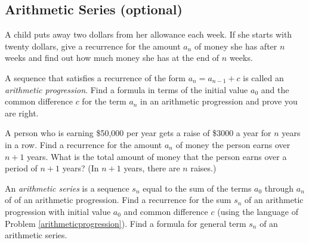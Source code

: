 \ep

\subsection{Arithmetic Series (optional)}
\bp
\item A child puts away two dollars from her allowance each week.  If she
starts with twenty dollars, give a recurrence for the amount $a_n$ of
money she has after $n$ weeks and find out how much money she has at the
end of 
$n$ weeks. \label{childsaving}

\item A sequence that satisfies a recurrence of the form $a_n=a_{n-1} +c$
is called an {\em arithmetic progression}. Find a formula in terms of
the initial value
$a_0$ and the common difference $c$ for the term
$a_n$ in an arithmetic progression and prove you are
right.\label{arithmeticprogression}
\item A person who is earning \$50,000 per year gets a raise of \$3000 a
year for $n$ years in a row.  Find a recurrence for the amount $a_n$ of
money the person earns over $n+1$ years. What is the total amount of money
that the person earns over a period of $n+1$ years?  (In
$n+1$ years, there are
$n$ raises.) \label{constantraise}
\item An {\em arithmetic
series} is a sequence
$s_n$ equal to the sum of the terms
$a_0$ through
$a_n$ of of an arithmetic progression.  Find a recurrence for the sum
$s_n$ of an arithmetic progression with initial value $a_0$ and common
difference
$c$ (using the language of Problem \ref{arithmeticprogression}).  Find a
formula for general term $s_n$ of an arithmetic  series.
\ep


